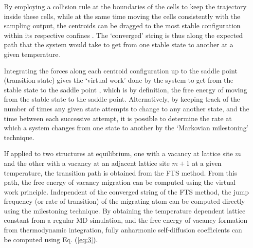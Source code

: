 \documentclass{article}
\begin{document}
By employing a collision rule at the boundaries of the cells to keep the trajectory inside these cells, while at the same time moving the cells consistently with the sampling output, the centroids can be dragged to the most stable configuration within its respective confines \cite{Vanden-Eijnden2009}. The \enquote*{converged} string is thus along the expected path that the system would take to get from one stable state to another at a given temperature.

Integrating the forces along each centroid configuration up to the saddle point (transition state) gives the \enquote*{virtual work} done by the system to get from the stable state to the saddle point \cite{Swinburne2017}, which is by definition, the free energy of moving from the stable state to the saddle point. Alternatively, by keeping track of the number of times any given state attempts to change to any another state, and the time between each successive attempt, it is possible to determine the rate at which a system changes from one state to another by the \enquote*{Markovian milestoning} \cite{Vanden-Eijnden2009a} technique.

If applied to two structures at equilibrium, one with a vacancy at lattice site $m$ and the other with a vacancy at an adjacent lattice site $m+1$ at a given temperature, the transition path is obtained from the FTS method. From this path, the free energy of vacancy migration can be computed using the virtual work principle. Independent of the converged string of the FTS method, the jump frequency (or rate of transition) of the migrating atom can be computed directly using the milestoning technique. By obtaining the temperature dependent lattice constant from a regular MD simulation, and the free energy of vacancy formation from thermodynamic integration, fully anharmonic self-diffusion coefficients can be computed using Eq. (\ref{eq:3}).
\end{document}
